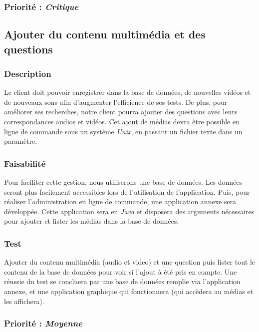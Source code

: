 \subsubsection{Priorité : \textit{Critique}}

\subsection{Ajouter du contenu multimédia et des questions}

\subsubsection{Description}

Le client doit pouvoir enregistrer dans la base de données, de nouvelles vidéos et de nouveaux sons afin d’augmenter l’efficience de ses tests. De plus, pour améliorer ses recherches, notre client pourra ajouter des questions avec leurs correspondances audios et vidéos.
Cet ajout de médias devra être possible en ligne de commande sous un système \textit{Unix}, en passant un fichier texte dans un paramètre.

\subsubsection{Faisabilité}

Pour faciliter cette gestion, nous utiliserons une base de données. Les données seront plus facilement accessibles lors de l’utilisation de l’application.
Puis, pour réaliser l'administration en ligne de commande, une application annexe sera développée. Cette application sera en \textit{Java} et disposera des arguments nécessaires pour ajouter et lister les médias dans la base de données.

\subsubsection{Test}

Ajouter du contenu multimédia (audio et video) et une question puis lister tout le contenu de la base de données pour voir si l’ajout à été pris en compte.
Une réussie du test se concluera par une base de données remplie via l'application annexe, et une application graphique qui fonctionnera (qui accèdera au médias et les affichera).

\subsubsection{Priorité : \textit{Moyenne}}

